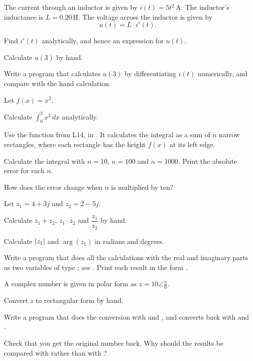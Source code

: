 The current through an inductor is given by $i(t) = 5t^2\,\text{A}$. The inductor's inductance is
$L = 0.20\,\text{H}$. The voltage across the inductor is given by
\[
  u(t) = L \cdot i'(t).
\]
\begin{parts}
  \item Find $i'(t)$ analytically, and hence an expression for $u(t)$.
  \item Calculate $u(3)$ by hand.
  \item Write a program that calculates $u(3)$ by differentiating $i(t)$ numerically, and compare
    with the hand calculation.
\end{parts}

Let $f(x) = x^2$.
\begin{parts}
  \item Calculate $\int_0^3 x^2\,dx$ analytically.
  \item Use the function  from L14, in
    . It calculates the integral as a sum of $n$ narrow
    rectangles, where each rectangle has the height $f(x)$ at its left edge.
  \item Calculate the integral with $n = 10$, $n = 100$ and $n = 1000$. Print the absolute error
    for each $n$.
  \item How does the error change when $n$ is multiplied by ten?
\end{parts}



Let $z_1 = 4 + 3j$ and $z_2 = 2 - 5j$.
\begin{parts}
  \item Calculate $z_1 + z_2$, $z_1 \cdot z_2$ and $\dfrac{z_1}{z_2}$ by hand.
  \item Calculate $\lvert z_1\rvert$ and $\arg(z_1)$ in radians and degrees.
  \item Write a program that does all the calculations with the real and imaginary parts as two
    variables of type ; see . Print each result in the form
    .
\end{parts}

A complex number is given in polar form as $z = 10\angle\frac{\pi}{6}$.
\begin{parts}
  \item Convert $z$ to rectangular form by hand.
  \item Write a program that does the conversion with  and , and converts
    back with  and .
  \item Check that you get the original number back. Why should the results be compared with
     rather than with \code{==}?
\end{parts}

